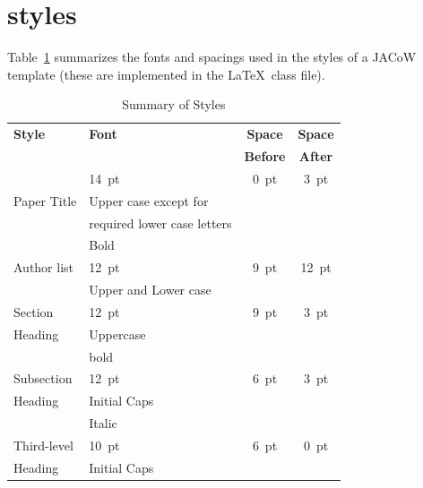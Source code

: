 \documentclass[a4paper,
              ]{jacow}
\begin{document}
\section{styles}

Table~\ref{style-tab} summarizes the fonts and spacings used in the styles of
a JACoW template (these are implemented in the \LaTeX\ class file).
\begin{table}[h!t]
    \setlength\tabcolsep{3.8pt}
    \caption{Summary of Styles}
    \label{style-tab}
    \begin{tabular}{@{}llcc@{}}
        \toprule
        \textbf{Style} & \textbf{Font}               & \textbf{Space}  & \textbf{Space} \\
                       &                             & \textbf{Before} & \textbf{After} \\
        \midrule
                       & \SI{14}{pt}                 & \SI{0}{pt}      & \SI{3}{pt}  \\
          Paper Title  & Upper case except for       &                 &      \\
                       & required lower case letters &                 &      \\   %
                       & Bold                        &                 &      \\
         \midrule
          Author list  & \SI{12}{pt}                 & \SI{9}{pt}      & \SI{12}{pt} \\
                       & Upper and Lower case        &                 &      \\
         \midrule
         Section       & \SI{12}{pt}                 & \SI{9}{pt}      & \SI{3}{pt}  \\
         Heading       & Uppercase                   &                 &      \\
                       & bold                        &                 &      \\
        \midrule
         Subsection    & \SI{12}{pt}                 & \SI{6}{pt}      & \SI{3}{pt}  \\
         Heading       & Initial Caps                &                 &      \\
                       & Italic                      &                 &      \\
        \midrule
         Third-level   & \SI{10}{pt}                 & \SI{6}{pt}           & \SI{0}{pt}  \\
         Heading       & Initial Caps                &                 &      \\

\end{tabular}
\end{table}
\end{document}
